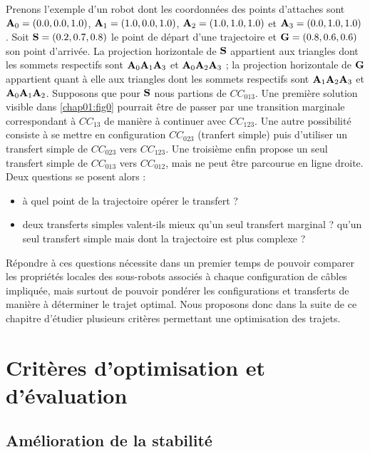 Prenons l'exemple d'un robot dont les coordonn\'ees des points d'attaches sont 
${\bf A}_0 = (0.0, 0.0, 1.0)$, ${\bf A}_1 = (1.0, 0.0, 1.0)$, ${\bf A}_2 = 
(1.0, 1.0, 1.0)$ et ${\bf A}_3 = (0.0, 1.0, 1.0)$. Soit ${\bf S} = (0.2, 0.7, 
0.8)$ le point de d\'epart d'une trajectoire et ${\bf G} = (0.8, 0.6, 0.6)$ son 
point d'arriv\'ee. La projection horizontale de ${\bf S}$ appartient aux 
triangles dont les sommets respectifs sont ${\bf A}_0{\bf A}_1{\bf A}_3$ et 
${\bf A}_0{\bf A}_2{\bf A}_3$ ; la projection horizontale de ${\bf G}$ 
appartient quant \`a elle aux triangles dont les sommets respectifs sont ${\bf 
A}_1{\bf A}_2{\bf A}_3$ et ${\bf A}_0{\bf A}_1{\bf A}_2$. Supposons que pour 
${\bf S}$ nous partions de $CC_{013}$. Une premi\`ere solution visible 
dans \ref{chap01:fig0} pourrait \^etre de passer par une transition marginale 
correspondant \`a $CC_{13}$ de mani\`ere \`a continuer avec $CC_{123}$. Une 
autre possibilit\'e consiste \`a se mettre en configuration $CC_{023}$ 
(tranfert simple) puis d'utiliser un transfert simple de $CC_{023}$ vers 
$CC_{123}$. Une troisi\`eme enfin propose un seul transfert simple de 
$CC_{013}$ vers $CC_{012}$, mais ne peut \^etre parcourue en ligne droite. Deux 
questions se posent alors :
\begin{itemize}
 \item \`a quel point de la trajectoire op\'erer le transfert ?
  \item  deux transferts simples valent-ils mieux qu'un seul transfert marginal 
? qu'un seul transfert simple mais dont la trajectoire est plus complexe ? 
\end{itemize}

R\'epondre \`a ces questions n\'ecessite dans un premier temps de 
pouvoir comparer les propri\'et\'es locales des sous-robots associ\'es \`a 
chaque configuration de c\^ables impliqu\'ee, mais surtout de pouvoir 
pond\'erer les configurations et transferts de mani\`ere \`a d\'eterminer le 
trajet optimal. Nous proposons donc dans la suite de ce chapitre d'\'etudier 
plusieurs crit\`eres permettant une optimisation des trajets.

\section{Crit\`eres d'optimisation et d'\'evaluation}

\subsection{Am\'elioration de la stabilit\'e}

